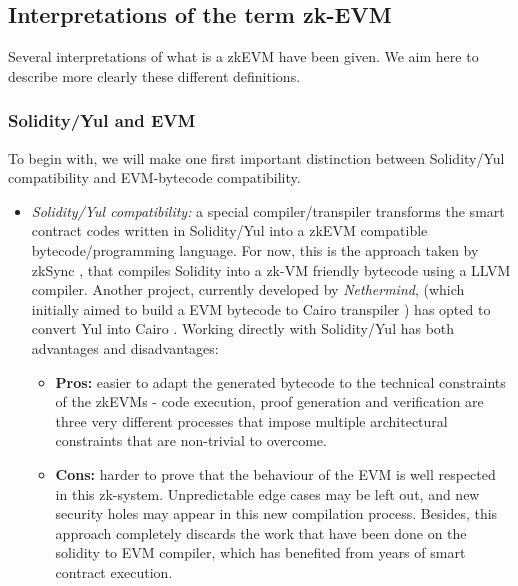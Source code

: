 \subsection{Interpretations of the term zk-EVM}
Several interpretations of what is a zkEVM have been given. We aim here to describe more clearly these different definitions. 

\subsubsection{Solidity/Yul and EVM}
To begin with, we will make one first important distinction between Solidity/Yul compatibility and EVM-bytecode compatibility.
\begin{itemize}
    \item \textit{Solidity/Yul compatibility:} a special compiler/transpiler transforms the smart contract codes written in Solidity/Yul into a zkEVM compatible bytecode/programming language. For now, this is the approach taken by zkSync  \cite{mediumZKEVM, zksynczkEVM}, that compiles Solidity into a zk-VM friendly bytecode using a LLVM compiler. Another project, currently developed by \textit{Nethermind}, (which initially aimed to build a EVM bytecode to Cairo transpiler \cite{nethermindEvmCairo}) has opted to convert Yul into Cairo \cite{nethermindSolCairo}. Working directly with Solidity/Yul has both advantages and disadvantages: 
    \begin{itemize}
        \item \textbf{Pros:} easier to adapt the generated bytecode to the technical constraints of the zkEVMs - code execution, proof generation and verification are three very different processes that impose multiple architectural constraints that are non-trivial to overcome. 
        \item \textbf{Cons:} harder to prove that the behaviour of the EVM is well respected in this zk-system. Unpredictable edge cases may be left out, and new security holes may appear in this new compilation process. Besides, this approach completely discards the work that have been done on the solidity to EVM compiler, which has benefited from years of smart contract execution.
    \end{itemize}
    

\end{itemize}
